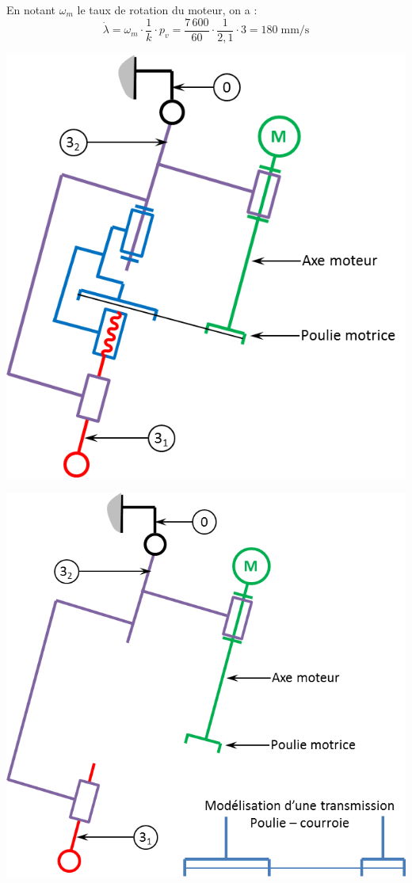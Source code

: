 \documentclass[10pt]{article}
\newif\ifprof
\begin{document}
\ifprof
\begin{corrige}
En notant $\omega_m$ le taux de rotation du moteur, on a :
$$\dot{\lambda} = \omega_m \cdot \dfrac{1}{k}\cdot p_v  = 
 \dfrac{7\,600}{60} \cdot \dfrac{1}{2,1}\cdot 3=180 \; \text{mm/s}$$
 
 
\begin{center}
\includegraphics[width=.3\textwidth]{images/Schema}
\end{center}
\end{corrige}
\else
\begin{minipage}[c]{.49\linewidth}
\begin{center}
\includegraphics[width=.9\textwidth]{images/Schema_Vide}
\end{center}
\end{minipage} \hfill
\end{document}
